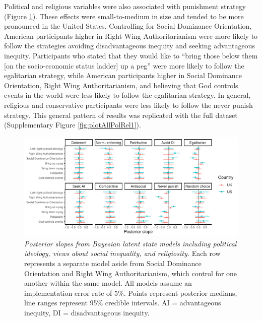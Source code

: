 \documentclass[
  man,floatsintext]{apa6}
\begin{document}
Political and religious variables were also associated with punishment strategy
(Figure \ref{fig:plotAllPolRel2}). These effects were small-to-medium in size
and tended to be more pronounced in the United States. Controlling for Social
Dominance Orientation, American participants higher in Right Wing
Authoritarianism were more likely to follow the strategies avoiding
disadvantageous inequity and seeking advantageous inequity. Participants who
stated that they would like to ``bring those below them {[}on the socio-economic
status ladder{]} up a peg'' were more likely to follow the egalitarian strategy,
while American participants higher in Social Dominance Orientation, Right Wing
Authoritarianism, and believing that God controls events in the world were less
likely to follow the egalitarian strategy. In general, religious and
conservative participants were less likely to follow the never punish strategy.
This general pattern of results was replicated with the full dataset
(Supplementary Figure \ref{fig:plotAllPolRel1}).









\begin{figure}
\centering
\includegraphics{manuscript_files/figure-latex/plotAllPolRel2-1.pdf}
\caption{\label{fig:plotAllPolRel2}\emph{Posterior slopes from Bayesian latent state models
including political ideology, views about social inequality, and religiosity.}
Each row represents a separate model aside from Social Dominance Orientation and
Right Wing Authoritarianism, which control for one another within the same
model. All models assume an implementation error rate of 5\%. Points represent
posterior medians, line ranges represent 95\% credible intervals. AI =
advantageous inequity, DI = disadvantageous inequity.}
\end{figure}
\end{document}
